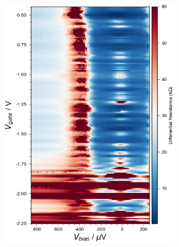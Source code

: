 \begin{figure}[h!]
    \centering
    \begin{subfigure}[b]{0.48\textwidth}
         \centering
         \includegraphics[width=\textwidth]{Pic/NW2_Vbias.png}
         \caption{}
         \label{}
     \end{subfigure}
     \hfill
     \begin{subfigure}[b]{0.48\textwidth}
         \centering

\end{subfigure}
\end{figure}
